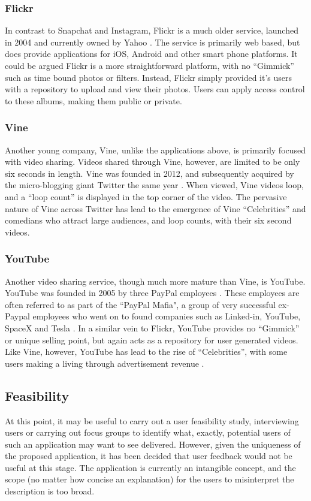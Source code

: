 \documentclass[a4paper]{article}
\begin{document}
\subsubsection{Flickr}
In contrast to Snapchat and Instagram, Flickr is a much older service, launched in 2004 and currently owned by Yahoo \cite{flickrWiki}.  The service is primarily web based, but does provide applications for iOS, Android and other smart phone platforms. It could be argued Flickr is a more straightforward platform, with no ``Gimmick'' such as time bound photos or filters. Instead, Flickr simply provided it's users with a repository to upload and view their photos. Users can apply access control to these albums, making them public or private.

\subsubsection{Vine}
Another young company, Vine, unlike the applications above, is primarily focused with video sharing. Videos shared through Vine, however, are limited to be only six seconds in length. Vine was founded in 2012, and subsequently acquired by the micro-blogging giant Twitter the same year \cite{vineWiki}. When viewed, Vine videos loop, and a ``loop count'' is displayed in the top corner of the video. The pervasive nature of Vine across Twitter has lead to the emergence of Vine ``Celebrities'' and comedians who attract large audiences, and loop counts, with their six second videos.

\subsubsection{YouTube}
Another video sharing service, though much more mature than Vine, is YouTube. YouTube was founded in 2005 by three PayPal employees \cite{youtubeWiki}. These employees are often referred to as part of the ``PayPal Mafia", a group of very successful ex-Paypal employees who went on to found companies such as Linked-in, YouTube, SpaceX and Tesla \cite{paypalMafia}. In a similar vein to Flickr, YouTube provides no ``Gimmick'' or unique selling point, but again acts as a repository for user generated videos. Like Vine, however, YouTube has lead to the rise of ``Celebrities'', with some users making a living through advertisement revenue \cite{richYoutube}.

\subsection{Feasibility}
At this point, it may be useful to carry out a user feasibility study, interviewing users or carrying out focus groups to identify what, exactly, potential users of such an application may want to see delivered. However, given the uniqueness of the proposed application, it has been decided that user feedback would not be useful at this stage. The application is currently an intangible concept, and the scope (no matter how concise an explanation) for the users to misinterpret the description is too broad.
\end{document}

